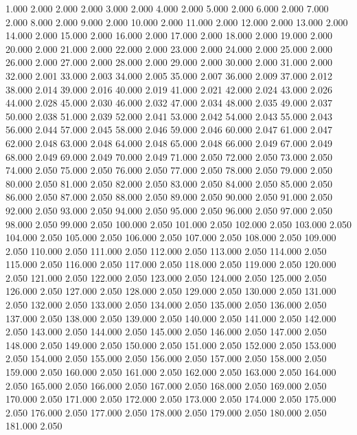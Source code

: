 1.000 2.000 
2.000 2.000 
3.000 2.000 
4.000 2.000 
5.000 2.000 
6.000 2.000 
7.000 2.000 
8.000 2.000 
9.000 2.000 
10.000 2.000 
11.000 2.000 
12.000 2.000 
13.000 2.000 
14.000 2.000 
15.000 2.000 
16.000 2.000 
17.000 2.000 
18.000 2.000 
19.000 2.000 
20.000 2.000 
21.000 2.000 
22.000 2.000 
23.000 2.000 
24.000 2.000 
25.000 2.000 
26.000 2.000 
27.000 2.000 
28.000 2.000 
29.000 2.000 
30.000 2.000 
31.000 2.000 
32.000 2.001 
33.000 2.003 
34.000 2.005 
35.000 2.007 
36.000 2.009 
37.000 2.012 
38.000 2.014 
39.000 2.016 
40.000 2.019 
41.000 2.021 
42.000 2.024 
43.000 2.026 
44.000 2.028 
45.000 2.030 
46.000 2.032 
47.000 2.034 
48.000 2.035 
49.000 2.037 
50.000 2.038 
51.000 2.039 
52.000 2.041 
53.000 2.042 
54.000 2.043 
55.000 2.043 
56.000 2.044 
57.000 2.045 
58.000 2.046 
59.000 2.046 
60.000 2.047 
61.000 2.047 
62.000 2.048 
63.000 2.048 
64.000 2.048 
65.000 2.048 
66.000 2.049 
67.000 2.049 
68.000 2.049 
69.000 2.049 
70.000 2.049 
71.000 2.050 
72.000 2.050 
73.000 2.050 
74.000 2.050 
75.000 2.050 
76.000 2.050 
77.000 2.050 
78.000 2.050 
79.000 2.050 
80.000 2.050 
81.000 2.050 
82.000 2.050 
83.000 2.050 
84.000 2.050 
85.000 2.050 
86.000 2.050 
87.000 2.050 
88.000 2.050 
89.000 2.050 
90.000 2.050 
91.000 2.050 
92.000 2.050 
93.000 2.050 
94.000 2.050 
95.000 2.050 
96.000 2.050 
97.000 2.050 
98.000 2.050 
99.000 2.050 
100.000 2.050 
101.000 2.050 
102.000 2.050 
103.000 2.050 
104.000 2.050 
105.000 2.050 
106.000 2.050 
107.000 2.050 
108.000 2.050 
109.000 2.050 
110.000 2.050 
111.000 2.050 
112.000 2.050 
113.000 2.050 
114.000 2.050 
115.000 2.050 
116.000 2.050 
117.000 2.050 
118.000 2.050 
119.000 2.050 
120.000 2.050 
121.000 2.050 
122.000 2.050 
123.000 2.050 
124.000 2.050 
125.000 2.050 
126.000 2.050 
127.000 2.050 
128.000 2.050 
129.000 2.050 
130.000 2.050 
131.000 2.050 
132.000 2.050 
133.000 2.050 
134.000 2.050 
135.000 2.050 
136.000 2.050 
137.000 2.050 
138.000 2.050 
139.000 2.050 
140.000 2.050 
141.000 2.050 
142.000 2.050 
143.000 2.050 
144.000 2.050 
145.000 2.050 
146.000 2.050 
147.000 2.050 
148.000 2.050 
149.000 2.050 
150.000 2.050 
151.000 2.050 
152.000 2.050 
153.000 2.050 
154.000 2.050 
155.000 2.050 
156.000 2.050 
157.000 2.050 
158.000 2.050 
159.000 2.050 
160.000 2.050 
161.000 2.050 
162.000 2.050 
163.000 2.050 
164.000 2.050 
165.000 2.050 
166.000 2.050 
167.000 2.050 
168.000 2.050 
169.000 2.050 
170.000 2.050 
171.000 2.050 
172.000 2.050 
173.000 2.050 
174.000 2.050 
175.000 2.050 
176.000 2.050 
177.000 2.050 
178.000 2.050 
179.000 2.050 
180.000 2.050 
181.000 2.050 
